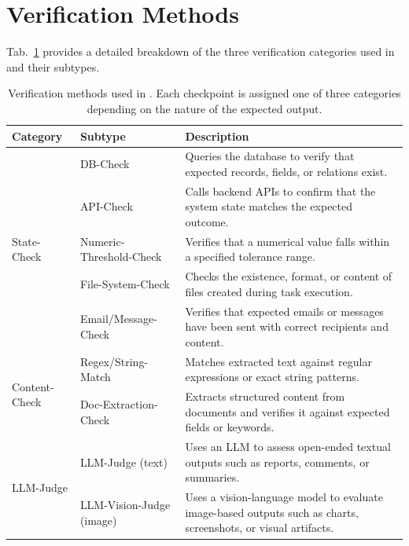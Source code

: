 \section{Verification Methods}
\label{app:verify}

Tab.~\ref{tab:verify-types} provides a detailed breakdown of the three verification categories used in \datasetname and their subtypes.

\begin{table}[h]
\centering
\small
\caption{Verification methods used in \datasetname. Each checkpoint is assigned one of three categories depending on the nature of the expected output.}
\label{tab:verify-types}
\vspace{1em}
\renewcommand{\arraystretch}{1.25}
\begin{tabular}{llp{7.5cm}}
\toprule
\textbf{Category} & \textbf{Subtype} & \textbf{Description} \\
\midrule
\multirow{5}{*}{State-Check}
  & DB-Check & Queries the database to verify that expected records, fields, or relations exist. \\
  & API-Check & Calls backend APIs to confirm that the system state matches the expected outcome. \\
  & Numeric-Threshold-Check & Verifies that a numerical value falls within a specified tolerance range. \\
  & File-System-Check & Checks the existence, format, or content of files created during task execution. \\
  & Email/Message-Check & Verifies that expected emails or messages have been sent with correct recipients and content. \\
\midrule
\multirow{2}{*}{Content-Check}
  & Regex/String-Match & Matches extracted text against regular expressions or exact string patterns. \\
  & Doc-Extraction-Check & Extracts structured content from documents and verifies it against expected fields or keywords. \\
\midrule
\multirow{2}{*}{LLM-Judge}
  & LLM-Judge (text) & Uses an LLM to assess open-ended textual outputs such as reports, comments, or summaries. \\
  & LLM-Vision-Judge (image) & Uses a vision-language model to evaluate image-based outputs such as charts, screenshots, or visual artifacts. \\
\bottomrule
\end{tabular}
\end{table}

